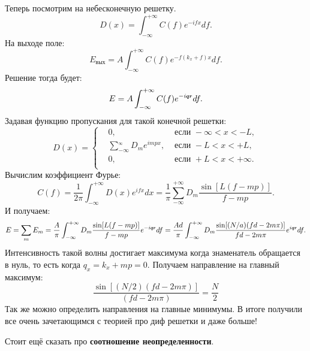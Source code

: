 Теперь посмотрим на небесконечную решетку.
\begin{equation*}
	D(x) = \int_{-\infty}^{+\infty} C(f) e^{-i f x} d f.
\end{equation*}
На выходе поле:
\begin{equation*}
	E_\text{вых} = A \int_{-\infty}^{+\infty} C(f) e^{-f(k_x +f)x}d f.
\end{equation*}
Решение тогда будет:
\begin{equation*}
	E = A \int_{-\infty}^{+\infty} C(f) e^{- i \smallvc{q} \smallvc{r}} d f.
\end{equation*}
Задавая функцию пропускания для такой конечной решетки:
\begin{equation*}
	D(x) =\left\{
	\begin{aligned}
		&0, &\text{ если } -\infty < x < - L,\\
		&\sum_{-\infty}^{_\infty} D_m e^{i m p x}, &\text{ если } - L < x < + L,\\
		&0, &\text{ если } + L < x < +\infty.\\
	\end{aligned}
	\right.
\end{equation*}
Вычислим коэффициент Фурье:
\begin{equation*}
	C(f) = \frac{1}{2 \pi} \int_{- \infty}^{+\infty} D(x) e^{i f x} dx = \frac{1}{\pi} \sum_{-\infty}^{+\infty} D_m \frac{\sin[L (f - mp)]}{f - mp}.
\end{equation*}
И получаем:
\begin{equation*}
	E = \sum_m E_m = \frac{A}{\pi} \int_{-\infty}^{+\infty} D_m \frac{\sin[L(f-mp)]}{f - mp}e^{-i \smallvc{q} \smallvc{r}} d f = \frac{A d}{\pi} \int_{-\infty}^{+\infty} D_m \frac{\sin[(N/a)(f d - 2 m \pi)]}{f d - 2m \pi}e^{i \smallvc{q} \smallvc{r}} d f.
\end{equation*}
Интенсивность такой волны достигает максимума когда знаменатель обращается в нуль, то есть когда $q_x = k_x + mp = 0$. Получаем направление на главный максимум:
\begin{equation*}
	\frac{\sin [(N/2)(fd - 2 m\pi)]}{(f d - 2 m \pi)} = \frac{N}{2}
\end{equation*}
Так же можно определить направления на главные минимумы. В итоге получили все очень зачетающимся с теорией про диф решетки и даже больше!

Стоит ещё сказать про \textbf{соотношение неопределенности}.

